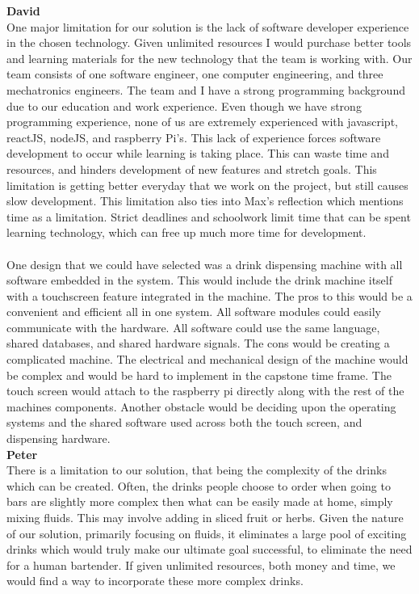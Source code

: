 \documentclass[12pt, titlepage]{article}
\begin{document}
\textbf{David}\\
One major limitation for our solution is the lack of software developer experience in the chosen technology. Given unlimited resources I would purchase better tools and learning materials for the new technology that the  team is working with. Our team consists of one software engineer, one computer engineering, and three mechatronics engineers. The team and I have a strong programming background due to our education and work experience. Even though we have strong programming experience, none of us are extremely experienced with javascript, reactJS, nodeJS, and raspberry Pi’s. This lack of experience forces software development to occur while learning is taking place. This can waste time and resources, and hinders development of new features and stretch goals. This limitation is getting better everyday that we work on the project, but still causes slow development. This limitation also ties into Max's reflection which mentions time as a limitation. Strict deadlines and schoolwork limit time that can be spent learning technology, which can free up much more time for development.\\

\noindent{}\\
One design that we could have selected was a drink dispensing machine with all software embedded in the system. This would include the drink machine itself with a touchscreen feature integrated in the machine. The pros to this would be a convenient and efficient all in one system. All software modules could easily communicate with the hardware. All software could use the same language, shared databases, and shared hardware signals. The cons would be creating a complicated machine. The electrical and mechanical design of the machine would be complex and would be hard to implement in the capstone time frame. The touch screen would attach to the raspberry pi directly along with the rest of the machines components. Another obstacle would be deciding upon the operating systems and the shared software used across both the touch screen, and dispensing hardware. \\

\textbf{Peter}\\
There is a limitation to our solution, that being the complexity of the drinks which can be created. Often, the drinks people choose to order when going to bars are slightly more complex then what can be easily made at home, simply mixing fluids. This may involve adding in sliced fruit or herbs. Given the nature of our solution, primarily focusing on fluids, it eliminates a large pool of exciting drinks which would truly make our ultimate goal successful, to eliminate the need for a human bartender. If given unlimited resources, both money and time, we would find a way to incorporate these more complex drinks.
\end{document}

